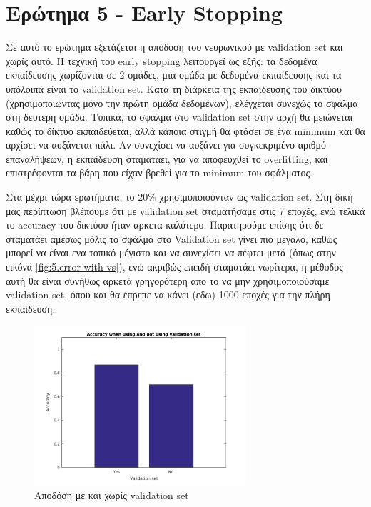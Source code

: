 \documentclass[12pt]{article}
\begin{document}
\section*{Ερώτημα 5 - Early Stopping}
Σε αυτό το ερώτημα εξετάζεται η απόδοση του νευρωνικού με validation set και χωρίς αυτό. Η τεχνική του early stopping  λειτουργεί ως εξής: τα δεδομένα εκπαίδευσης χωρίζονται σε 2 ομάδες, μια ομάδα με δεδομένα εκπαίδευσης και τα υπόλοιπα είναι το validation set. Κατα τη διάρκεια της εκπαίδευσης του δικτύου (χρησιμοποιώντας μόνο την πρώτη ομάδα δεδομένων), ελέγχεται συνεχώς το σφάλμα στη δευτερη ομάδα. Τυπικά, το σφάλμα στο validation set στην αρχή θα μειώνεται καθώς το δίκτυο εκπαιδεύεται, αλλά κάποια στιγμή θα φτάσει σε ένα minimum και θα αρχίσει να αυξάνεται πάλι. Αν συνεχίσει να αυξάνει για συγκεκριμένο αριθμό επαναλήψεων, η εκπαίδευση σταματάει, για να αποφευχθεί το overfitting, και επιστρέφονται τα βάρη που είχαν βρεθεί για το minimum του σφάλματος. 

Στα μέχρι τώρα ερωτήματα, το 20\% χρησιμοποιούνταν ως validation set. Στη δική μας περίπτωση βλέπουμε ότι με validation set σταματήσαμε στις 7 εποχές, ενώ τελικά το accuracy του δικτύου ήταν αρκετα καλύτερο. Παρατηρούμε επίσης ότι δε σταματάει αμέσως μόλις το σφάλμα στο Validation set γίνει πιο μεγάλο, καθώς μπορεί να είναι ενα τοπικό μέγιστο και να συνεχίσει να πέφτει μετά (όπως στην εικόνα \ref{fig:5.error-with-vs}), ενώ ακριβώς επειδή σταματάει νωρίτερα, η μέθοδος αυτή θα είναι συνήθως αρκετά γρηγορότερη απο το να μην χρησιμοποιούσαμε validation set, όπου και θα έπρεπε να κάνει (εδω) 1000 εποχές για την πλήρη εκπαίδευση.

\begin{figure}[H]
	 		\centering
			\includegraphics[width=0.7\textwidth]{fakelos/6c.valSet-lvl1-30-lvl2-0.png}
			\caption{Αποδόση με και χωρίς validation set}
			\label{fig:5.Val-set1}
		\end{figure}
\end{document}
